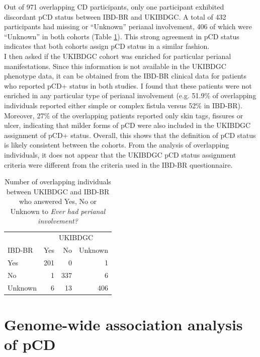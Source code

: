 Out of 971 overlapping CD participants, only one participant exhibited discordant pCD status between IBD-BR and UKIBDGC. A total of 432 participants had missing or “Unknown” perianal involvement, 406 of which were “Unknown” in both cohorts (Table \ref{table:cohort_pcd_agree}). This strong agreement in pCD status indicates that both cohorts assign pCD status in a similar fashion.\\

I then asked if the UKIBDGC cohort was enriched for particular perianal manifestations. Since this information is not available in the UKIBDGC phenotype data, it can be obtained from the IBD-BR clinical data for patients who reported pCD+ status in both studies. I found that these patients were not enriched in any particular type of perianal involvement (e.g. 51.9\% of overlapping individuals reported either simple or complex fistula versus 52\% in IBD-BR). Moreover, 27\% of the overlapping patients reported only skin tags, fissures or ulcer, indicating that milder forms of pCD were also included in the UKIBDGC assignment of pCD+ status. Overall, this shows that the definition of pCD status is likely consistent between the cohorts. From the analysis of overlapping individuals, it does not appear that the UKIBDGC pCD status assignment criteria were different from the criteria used in the IBD-BR questionnaire.


\begin{table}[htb]
  \caption[Overlapping individuals between UKIBDGC and IBD-BR]{Number of overlapping individuals between UKIBDGC and IBD-BR who answered Yes, No or Unknown to \textit{Ever had perianal involvement?}}
  \label{table:cohort_pcd_agree}
  \centering
  \begin{tabular}[t]{|l|r|r|r|}
  \hline
  \multicolumn{1}{|c|}{ } & \multicolumn{3}{c|}{UKIBDGC} \\
  \cline{2-4}
  IBD-BR& Yes & No & Unknown\\
  \hline
  Yes & 201 & 0 & 1\\
  \hline
  No & 1 & 337 & 6\\
  \hline
  Unknown & 6 & 13 & 406\\
  \hline
  \end{tabular}
  \end{table}

  \section{Genome-wide association analysis of pCD}
